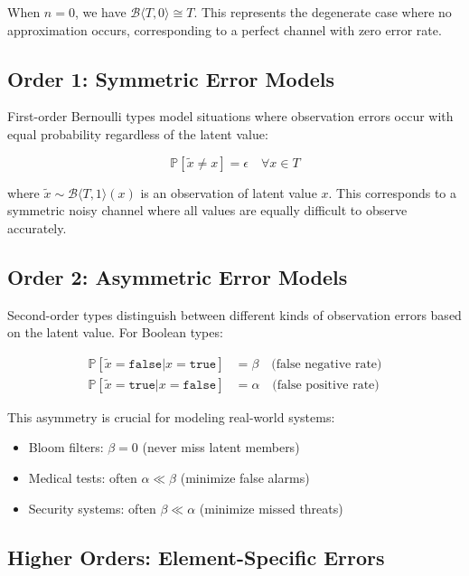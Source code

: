 \documentclass[11pt,final,hidelinks]{article}
\newcommand{\bernoulli}[2]{\mathcal{B}\langle #1, #2 \rangle}
\newcommand{\True}{\mathtt{true}}
\newcommand{\False}{\mathtt{false}}
\newcommand{\Prob}[1]{\mathbb{P}\left[#1\right]}
\begin{document}
When $n = 0$, we have $\bernoulli{T}{0} \cong T$. This represents the degenerate case where no approximation occurs, corresponding to a perfect channel with zero error rate.

\subsection{Order 1: Symmetric Error Models}

First-order Bernoulli types model situations where observation errors occur with equal probability regardless of the latent value:

\begin{equation}
\Prob{\tilde{x} \neq x} = \epsilon \quad \forall x \in T
\end{equation}

where $\tilde{x} \sim \bernoulli{T}{1}(x)$ is an observation of latent value $x$. This corresponds to a symmetric noisy channel where all values are equally difficult to observe accurately.

\subsection{Order 2: Asymmetric Error Models}

Second-order types distinguish between different kinds of observation errors based on the latent value. For Boolean types:

\begin{align}
\Prob{\tilde{x} = \False | x = \True} &= \beta \quad \text{(false negative rate)} \\
\Prob{\tilde{x} = \True | x = \False} &= \alpha \quad \text{(false positive rate)}
\end{align}

This asymmetry is crucial for modeling real-world systems:
\begin{itemize}
    \item Bloom filters: $\beta = 0$ (never miss latent members)
    \item Medical tests: often $\alpha \ll \beta$ (minimize false alarms)
    \item Security systems: often $\beta \ll \alpha$ (minimize missed threats)
\end{itemize}

\subsection{Higher Orders: Element-Specific Errors}
\end{document}

